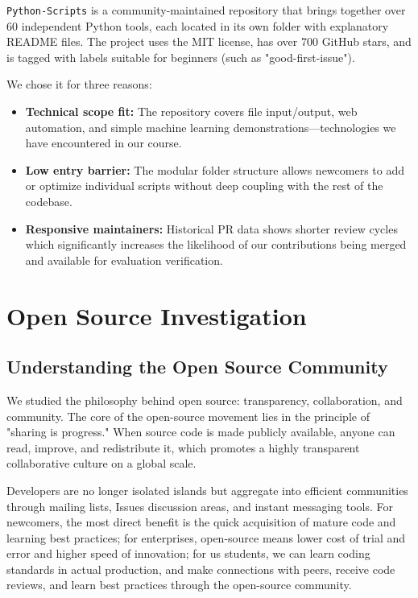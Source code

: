 \documentclass[12pt]{article}
\begin{document}
\texttt{Python-Scripts} is a community-maintained repository that brings together over 60 independent Python tools, each located in its own folder with explanatory README files. The project uses the MIT license, has over 700 GitHub stars, and is tagged with labels suitable for beginners (such as "good-first-issue"). 

We chose it for three reasons: 
\begin{itemize}
    \item \textbf{Technical scope fit:} The repository covers file input/output, web automation, and simple machine learning demonstrations—technologies we have encountered in our course.
    \item \textbf{Low entry barrier:} The modular folder structure allows newcomers to add or optimize individual scripts without deep coupling with the rest of the codebase.
    \item \textbf{Responsive maintainers:} Historical PR data shows shorter review cycles which significantly increases the likelihood of our contributions being merged and available for evaluation verification.
\end{itemize}


\section{Open Source Investigation}

\subsection{Understanding the Open Source Community}
We studied the philosophy behind open source: transparency, collaboration, and community. The core of the open-source movement lies in the principle of "sharing is progress." When source code is made publicly available, anyone can read, improve, and redistribute it, which promotes a highly transparent collaborative culture on a global scale. 

Developers are no longer isolated islands but aggregate into efficient communities through mailing lists, Issues discussion areas, and instant messaging tools. For newcomers, the most direct benefit is the quick acquisition of mature code and learning best practices; for enterprises, open-source means lower cost of trial and error and higher speed of innovation; for us students, we can learn coding standards in actual production, and make connections with peers, receive code reviews, and learn best practices through the open-source community. 
\end{document}
